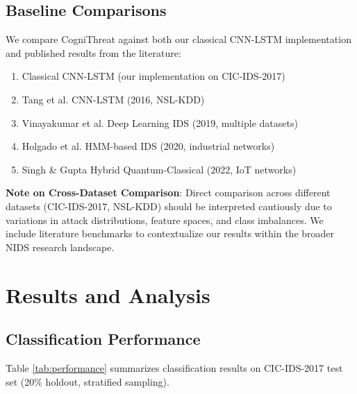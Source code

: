 \documentclass[conference]{IEEEtran}
\begin{document}
\subsection{Baseline Comparisons}
We compare CogniThreat against both our classical CNN-LSTM implementation and published results from the literature:
\begin{enumerate}
    \item Classical CNN-LSTM (our implementation on CIC-IDS-2017)
    \item Tang et al. \cite{ref5} CNN-LSTM (2016, NSL-KDD)
    \item Vinayakumar et al. \cite{ref4} Deep Learning IDS (2019, multiple datasets)
    \item Holgado et al. \cite{ref20} HMM-based IDS (2020, industrial networks)
    \item Singh \& Gupta \cite{ref14} Hybrid Quantum-Classical (2022, IoT networks)
\end{enumerate}

\textbf{Note on Cross-Dataset Comparison}: Direct comparison across different datasets (CIC-IDS-2017, NSL-KDD) should be interpreted cautiously due to variations in attack distributions, feature spaces, and class imbalances. We include literature benchmarks to contextualize our results within the broader NIDS research landscape.

\section{Results and Analysis}

\subsection{Classification Performance}

Table \ref{tab:performance} summarizes classification results on CIC-IDS-2017 test set (20\% holdout, stratified sampling).
\end{document}
